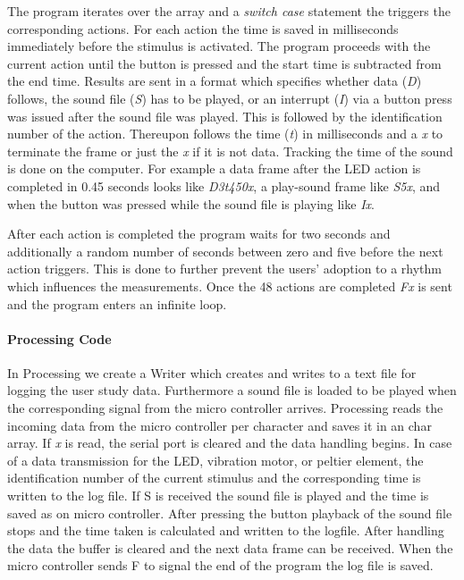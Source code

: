 The program iterates over the array and a \emph{switch case} statement the triggers the corresponding actions.
For each action the time is saved in milliseconds immediately before the stimulus is activated.
The program proceeds with the current action until the button is pressed and the start time is subtracted from the end time.
Results are sent in a format which specifies whether data (\emph{D}) follows, the sound file (\emph{S}) has to be played, or an interrupt (\emph{I}) via a button press was issued after the sound file was played. 
This is followed by the identification number of the action.
Thereupon follows the time (\emph{t}) in milliseconds and a \emph{x} to terminate the frame or just the \emph{x} if it is not data.
Tracking the time of the sound is done on the computer.
For example a data frame after the LED action is completed in 0.45 seconds looks like \emph{D3t450x}, a play-sound frame like \emph{S5x}, and when the button was pressed while the sound file is playing like \emph{Ix}.

After each action is completed the program waits for two seconds and additionally a random number of seconds between zero and five before the next action triggers.
This is done to further prevent the users' adoption to a rhythm which influences the measurements.
Once the 48 actions are completed \emph{Fx} is sent and the program enters an infinite loop.

\paragraph{Processing Code}
In Processing we create a Writer which creates and writes to a text file for logging the user study data.
Furthermore a sound file is loaded to be played when the corresponding signal from the micro controller arrives. 
Processing reads the incoming data from the micro controller per character and saves it in an char array. 
If \emph{x} is read, the serial port is cleared and the data handling begins. 
In case of a data transmission for the LED, vibration motor, or peltier element, the identification number of the current stimulus and the corresponding time is written to the log file. 
If S is received the sound file is played and the time is saved as on micro controller. 
After pressing the button playback of the sound file stops and the time taken is calculated and written to the logfile. 
After handling the data the buffer is cleared and the next data frame can be received. 
When the micro controller sends F to signal the end of the program the log file is saved.

